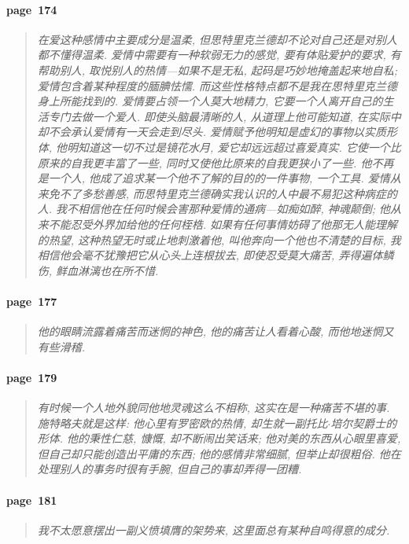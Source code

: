 \paragraph*{page~174}
\begin{quotation}
    \itshape
    在爱这种感情中主要成分是温柔, 但思特里克兰德却不论对自己还是对别人都不懂得温柔. 爱情中需要有一种软弱无力的感觉, 要有体贴爱护的要求, 有帮助别人, 取悦别人的热情---如果不是无私, 起码是巧妙地掩盖起来地自私; 爱情包含着某种程度的腼腆怯懦. 而这些性格特点都不是我在思特里克兰德身上所能找到的. 爱情要占领一个人莫大地精力, 它要一个人离开自己的生活专门去做一个爱人. 即使头脑最清晰的人, 从道理上他可能知道, 在实际中却不会承认爱情有一天会走到尽头. 爱情赋予他明知是虚幻的事物以实质形体, 他明知道这一切不过是镜花水月, 爱它却远远超过喜爱真实. 它使一个比原来的自我更丰富了一些, 同时又使他比原来的自我更狭小了一些. 他不再是一个人, 他成了追求某一个他不了解的目的的一件事物, 一个工具. 爱情从来免不了多愁善感, 而思特里克兰德确实我认识的人中最不易犯这种病症的人. 我不相信他在任何时候会害那种爱情的通病---如痴如醉, 神魂颠倒; 他从来不能忍受外界加给他的任何桎梏. 如果有任何事情妨碍了他那无人能理解的热望, 这种热望无时或止地刺激着他, 叫他奔向一个他也不清楚的目标, 我相信他会毫不犹豫把它从心头上连根拔去, 即使忍受莫大痛苦, 弄得遍体鳞伤, 鲜血淋漓也在所不惜. 
\end{quotation}

\paragraph*{page~177}
\begin{quotation}
    \itshape
    他的眼睛流露着痛苦而迷惘的神色, 他的痛苦让人看着心酸, 而他地迷惘又有些滑稽. 
\end{quotation}

\paragraph*{page~179}
\begin{quotation}
    \itshape
    有时候一个人地外貌同他地灵魂这么不相称, 这实在是一种痛苦不堪的事. 施特略夫就是这样: 他心里有罗密欧的热情, 却生就一副托比$\cdot$培尔契爵士的形体. 他的秉性仁慈, 慷慨, 却不断闹出笑话来; 他对美的东西从心眼里喜爱, 但自己却只能创造出平庸的东西; 他的感情非常细腻, 但举止却很粗俗. 他在处理别人的事务时很有手腕, 但自己的事却弄得一团糟. 
\end{quotation}

\paragraph*{page~181}
\begin{quotation}
    \itshape
    我不太愿意摆出一副义愤填膺的架势来, 这里面总有某种自鸣得意的成分.
\end{quotation}

